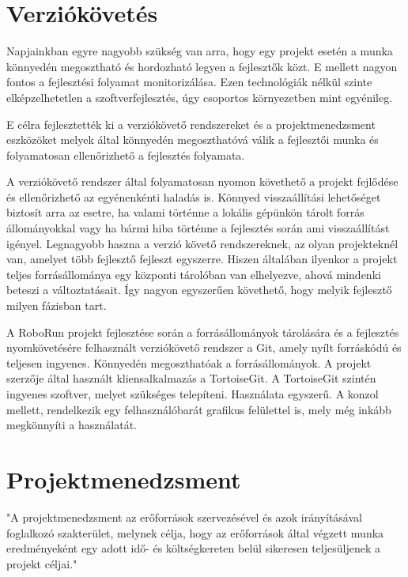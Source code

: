 \section{Verziókövetés}

Napjainkban egyre nagyobb szükség van arra, hogy egy projekt esetén a munka könnyedén megosztható és hordozható legyen a fejlesztők közt. E mellett nagyon fontos a fejlesztési folyamat monitorizálása. Ezen technológiák nélkül szinte elképzelhetetlen a szoftverfejlesztés, úgy csoportos környezetben mint egyénileg.

	E célra fejlesztették  ki a verziókövető rendszereket és a projektmenedzsment eszközöket melyek által könnyedén megoszthatóvá válik a fejlesztői munka és folyamatosan ellenőrizhető a fejlesztés folyamata.  
	
	A verziókövető rendszer által  folyamatosan nyomon követhető a projekt fejlődése és ellenőrizhető az egyénenkénti haladás is. Könnyed visszaállítási lehetőséget biztosít arra az esetre, ha valami történne a lokális gépünkön tárolt forrás állományokkal vagy ha bármi hiba történne a fejlesztés során ami visszaállítást igényel. Legnagyobb haszna a verzió követő rendszereknek, az olyan projekteknél van, amelyet több fejlesztő fejleszt egyszerre. Hiszen általában ilyenkor a projekt teljes forrásállománya egy központi tárolóban van elhelyezve, ahová mindenki beteszi a változtatásait. Így nagyon egyszerűen követhető, hogy melyik fejlesztő milyen fázisban tart. 
	
	A RoboRun projekt fejlesztése során a forrásállományok tárolására és a fejlesztés nyomkövetésére felhasznált verziókövető rendszer a Git\citep{git}, amely nyílt forráskódú és teljesen ingyenes. Könnyedén megoszthatóak a forrásállományok. A projekt szerzője által használt kliensalkalmazás a  TortoiseGit\citep{tortoisegit}. A TortoiseGit szintén ingyenes szoftver, melyet szükséges telepíteni. Használata egyszerű. A konzol mellett, rendelkezik egy felhasználóbarát grafikus felülettel is, mely még inkább megkönnyíti a használatát.

\section{Projektmenedzsment}

"A projektmenedzsment az erőforrások szervezésével és azok irányításával foglalkozó szakterület, melynek célja, hogy az erőforrások által végzett munka eredményeként egy adott idő- és költségkereten belül sikeresen teljesüljenek a projekt céljai."\cite{projektmenedzsment}

